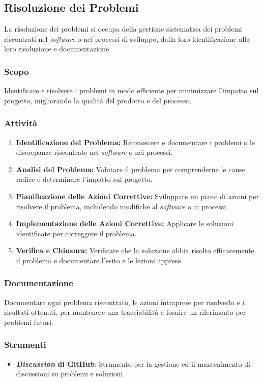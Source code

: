 \subsection{Risoluzione dei Problemi}

La risoluzione dei problemi si occupa della gestione sistematica dei problemi
riscontrati nel \textit{software} o nei processi di sviluppo, dalla loro
identificazione alla loro risoluzione e documentazione.

\subsubsection{Scopo}
Identificare e risolvere i problemi in modo efficiente per minimizzare l'impatto
sul progetto, migliorando la qualità del prodotto e del processo.

\subsubsection{Attività}
\begin{enumerate}
	\item \textbf{Identificazione del Problema:} Riconoscere e documentare i
	      problemi o le discrepanze riscontrate nel \textit{software} o nei
	      processi.
	\item \textbf{Analisi del Problema:} Valutare il problema per comprenderne
	      le cause radice e determinare l'impatto sul progetto.
	\item \textbf{Pianificazione delle Azioni Correttive:} Sviluppare un piano
	      di azioni per risolvere il problema, includendo modifiche al
	      \textit{software} o ai processi.
	\item \textbf{Implementazione delle Azioni Correttive:} Applicare le
	      soluzioni identificate per correggere il problema.
	\item \textbf{Verifica e Chiusura:} Verificare che la soluzione abbia
	      risolto efficacemente il problema e documentare l'esito e le lezioni
	      apprese.
\end{enumerate}

\subsubsection{Documentazione}
Documentare ogni problema riscontrato, le azioni intraprese per risolverlo e i
risultati ottenuti, per mantenere una tracciabilità e fornire un riferimento
per problemi futuri.

\subsubsection{Strumenti}
\begin{itemize}
	\item \textbf{\textit{Discussion} di GitHub\g}: Strumento per la gestione ed
	      il mantenimento di discussioni su problemi e soluzioni.
\end{itemize}
